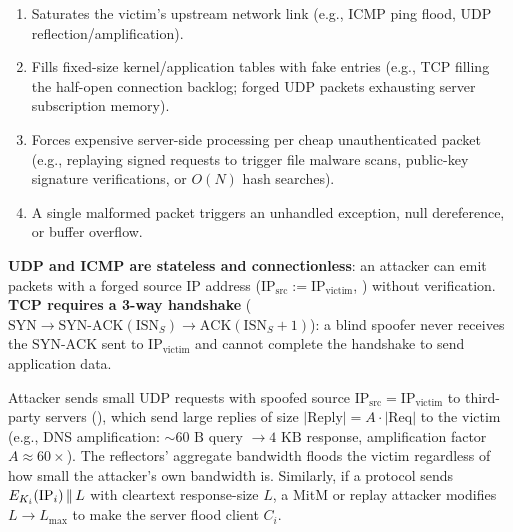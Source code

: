 \begin{compactitem}
  \item {}
  \begin{enumerate}[label=(\arabic*), leftmargin=1.8em]
    \item {} Saturates the victim's upstream network link (e.g., ICMP ping flood, UDP reflection/amplification).
    \item {} Fills fixed-size kernel/application tables with fake entries (e.g., TCP  filling the half-open connection backlog; forged UDP  packets exhausting server subscription memory).
    \item {} Forces expensive server-side processing per cheap unauthenticated packet (e.g., replaying signed requests to trigger file malware scans, public-key signature verifications, or $O(N)$ hash searches).
    \item {} A single malformed packet triggers an unhandled exception, null dereference, or buffer overflow.
  \end{enumerate}
  \item {}
  \textbf{UDP and ICMP are stateless and connectionless}: an attacker can emit packets with a forged source IP address ($\mathrm{IP}_{\text{src}} := \mathrm{IP}_{\text{victim}}$, ) without verification. \textbf{TCP requires a 3-way handshake} ($\text{SYN} \to \text{SYN-ACK}(\mathrm{ISN}_S) \to \text{ACK}(\mathrm{ISN}_S+1)$): a blind spoofer never receives the $\text{SYN-ACK}$ sent to $\mathrm{IP}_{\text{victim}}$ and cannot complete the handshake to send application data.
  \item {}
  Attacker sends small UDP requests with spoofed source $\mathrm{IP}_{\text{src}} = \mathrm{IP}_{\text{victim}}$ to third-party servers (), which send large replies of size $|\text{Reply}| = A \cdot |\text{Req}|$ to the victim (e.g., DNS amplification: $\sim 60\text{ B}$ query $\to 4\text{ KB}$ response, amplification factor $A \approx 60\times$). The reflectors' aggregate bandwidth floods the victim regardless of how small the attacker's own bandwidth is. Similarly, if a protocol sends $E_{K_i}(\mathrm{IP}_i) \,\|\, L$ with cleartext response-size $L$, a MitM or replay attacker modifies $L \to L_{\max}$ to make the server flood client $C_i$.
\end{compactitem}

